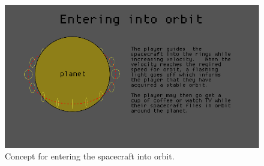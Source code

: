 \begin{figure}[H]
  \centering
  \includegraphics[scale=0.5]{../../milestone2/images/12-orbit.png}
  \caption{Concept for entering the spacecraft into orbit.}
\end{figure}





